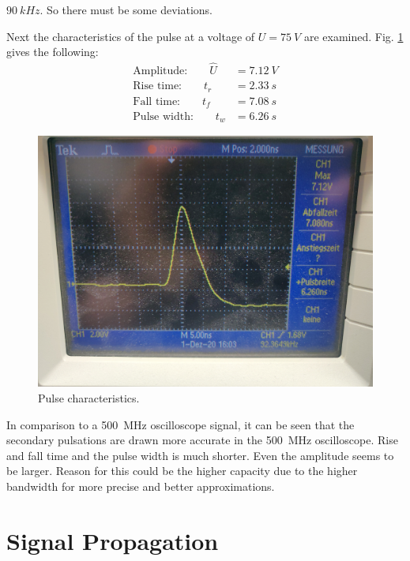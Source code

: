     $ \SI{90}{kHz} $. So there must be some deviations.\par\medskip
    Next the characteristics of the pulse at a voltage of $ U=\SI{75}{V} $ are examined. Fig. \cref{fig:pulsuntersuchung}
    gives the following:
    \begin{align}
        \text{Amplitude:}\qquad \hat{U}&=\SI{7.12}{V}\\
        \text{Rise time:}\qquad t_r&=\SI{2.33}{s}\\
        \text{Fall time:}\qquad t_f&=\SI{7.08}{s}\\
        \text{Pulse width:}\qquad t_w&=\SI{6.26}{s}
    \end{align}
    \begin{figure}[h]
        \centering
        \includegraphics[width=0.7\linewidth]{messdaten/Pulsuntersuchung.jpg}
        \caption[Pulse characteristics]{Pulse characteristics.}
        \label{fig:pulsuntersuchung}
    \end{figure}
    In comparison to a \SI{500}{MHz} oscilloscope signal, it can be seen that the secondary pulsations are drawn more accurate in
    the \SI{500}{MHz} oscilloscope. Rise and fall time and the pulse width is much shorter. Even the amplitude seems to be larger.
    Reason for this could be the higher capacity due to the higher bandwidth for more precise and better approximations.
\section{Signal Propagation}
%
